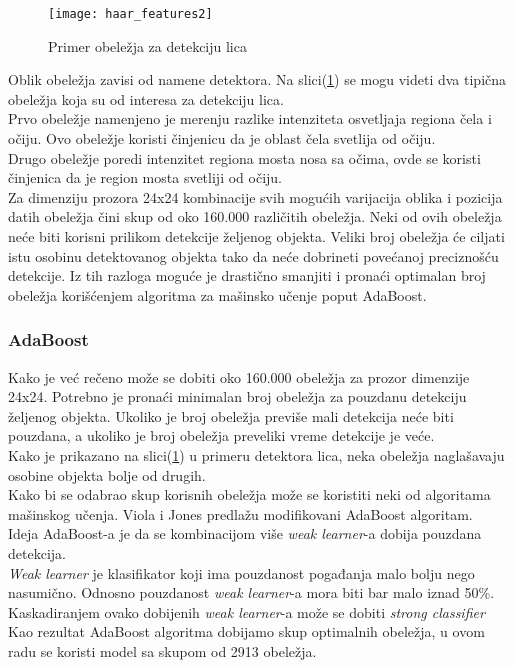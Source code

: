 \begin{figure}[H]
  \centering
  \texttt{[image: haar\_features2]}
  \caption{Primer obeležja za detekciju lica \cite{Viola2001RapidOD}}
  \label{haar_features_img2}
\end{figure}

Oblik obeležja zavisi od namene detektora.
Na slici(\ref{haar_features_img2}) se mogu videti dva tipična obeležja koja su od
interesa za detekciju lica. \\
Prvo obeležje namenjeno je merenju razlike intenziteta osvetljaja regiona čela i očiju.
Ovo obeležje koristi činjenicu da je oblast čela svetlija od očiju. \\
Drugo obeležje poredi intenzitet regiona mosta nosa sa očima, ovde se koristi
činjenica da je region mosta svetliji od očiju. \\

Za dimenziju prozora 24x24 kombinacije svih mogućih varijacija oblika i pozicija
datih obeležja čini skup od oko 160.000 različitih obeležja.
Neki od ovih obeležja neće biti korisni prilikom detekcije željenog objekta.
Veliki broj obeležja će ciljati istu osobinu detektovanog objekta tako da neće
dobrineti povećanoj preciznošću detekcije.
Iz tih razloga moguće je drastično smanjiti i pronaći optimalan broj obeležja
korišćenjem algoritma za mašinsko učenje poput AdaBoost. \\

\subsubsection{AdaBoost}

Kako je već rečeno može se dobiti oko 160.000 obeležja za prozor dimenzije
24x24.
Potrebno je pronaći minimalan broj obeležja za pouzdanu detekciju željenog objekta.
Ukoliko je broj obeležja previše mali detekcija neće biti pouzdana, a ukoliko je
broj obeležja preveliki vreme detekcije je veće. \\
Kako je prikazano na slici(\ref{haar_features_img2}) u primeru detektora lica,
neka obeležja naglašavaju osobine objekta bolje od drugih. \\

Kako bi se odabrao skup korisnih obeležja može se koristiti neki od algoritama
mašinskog učenja. Viola i Jones predlažu modifikovani AdaBoost algoritam. \\

Ideja AdaBoost-a je da se kombinacijom više \emph{weak learner}-a dobija
pouzdana detekcija. \\
\emph{Weak learner} je klasifikator koji ima pouzdanost pogađanja malo bolju
nego nasumično. Odnosno pouzdanost \emph{weak learner}-a mora biti bar malo
iznad 50\%. \\
Kaskadiranjem ovako dobijenih \emph{weak learner}-a može se dobiti \emph{strong
  classifier} \\
Kao rezultat AdaBoost algoritma dobijamo skup optimalnih obeležja, u ovom radu se koristi
model sa skupom od 2913 obeležja.

